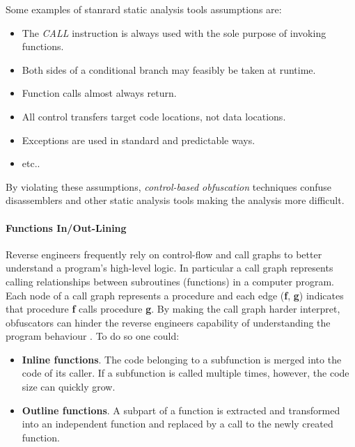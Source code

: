 \documentclass[pdfa%
,cucitura%
]{toptesi}
\begin{document}
Some examples of stanrard static analysis tools assumptions are:
\begin{itemize}
	\item The \textit{CALL} instruction is always used with the sole purpose of invoking functions.
	
	\item Both sides of a conditional branch may feasibly be taken at runtime.
	
	\item Function calls almost always return.
	
	\item All control transfers target code locations, not data locations.
	
	\item Exceptions are used in standard and predictable ways.
	
	\item etc..
\end{itemize}

By violating these assumptions, \textit{control-based obfuscation} techniques confuse disassemblers and other static analysis tools making the analysis more difficult.

\paragraph{Functions In/Out-Lining}
Reverse engineers frequently rely on control-flow and call graphs to better understand a program's high-level logic. In particular a call graph represents calling relationships between subroutines (functions) in a computer program. Each node of a call graph represents a procedure and each edge (\textbf{f}, \textbf{g}) indicates that procedure \textbf{f} calls procedure \textbf{g}. By making the call graph harder interpret, obfuscators can hinder the reverse engineers capability of understanding the program behaviour \cite{DangPRE}. To do so one could:

\begin{itemize}
	\item \textbf{Inline functions}.
	The code belonging to a subfunction is merged into the code of its caller. If a subfunction is called multiple times, however, the code size can quickly grow.
	
	\item \textbf{Outline functions}.
	A subpart of a function is extracted and transformed into an independent function and replaced by a call to the newly created function.
\end{itemize}
\end{document}
